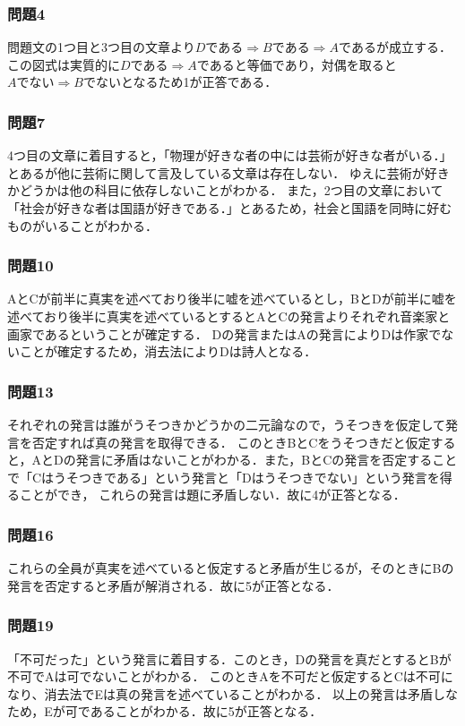 \documentclass[12pt]{jarticle}
\begin{document}
\subsubsection{問題4}
問題文の1つ目と3つ目の文章より$Dである \Rightarrow Bである \Rightarrow Aである$が成立する．
この図式は実質的に$Dである \Rightarrow Aである$と等価であり，対偶を取ると$Aでない \Rightarrow Bでない$となるため1が正答である．
\subsubsection{問題7}
4つ目の文章に着目すると，「物理が好きな者の中には芸術が好きな者がいる．」とあるが他に芸術に関して言及している文章は存在しない．
ゆえに芸術が好きかどうかは他の科目に依存しないことがわかる．
また，2つ目の文章において「社会が好きな者は国語が好きである．」とあるため，社会と国語を同時に好むものがいることがわかる．
\subsubsection{問題10}
AとCが前半に真実を述べており後半に嘘を述べているとし，BとDが前半に嘘を述べており後半に真実を述べているとするとAとCの発言よりそれぞれ音楽家と画家であるということが確定する．
Dの発言またはAの発言によりDは作家でないことが確定するため，消去法によりDは詩人となる．
\subsubsection{問題13}
それぞれの発言は誰がうそつきかどうかの二元論なので，うそつきを仮定して発言を否定すれば真の発言を取得できる．
このときBとCをうそつきだと仮定すると，AとDの発言に矛盾はないことがわかる．また，BとCの発言を否定することで「Cはうそつきである」という発言と「Dはうそつきでない」という発言を得ることができ，
これらの発言は題に矛盾しない．故に4が正答となる．
\subsubsection{問題16}
これらの全員が真実を述べていると仮定すると矛盾が生じるが，そのときにBの発言を否定すると矛盾が解消される．故に5が正答となる．
\subsubsection{問題19}
「不可だった」という発言に着目する．このとき，Dの発言を真だとするとBが不可でAは可でないことがわかる．
このときAを不可だと仮定するとCは不可になり、消去法でEは真の発言を述べていることがわかる．
以上の発言は矛盾しなため，Eが可であることがわかる．故に5が正答となる．
\end{document}
